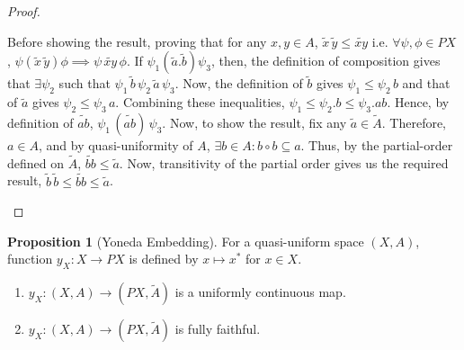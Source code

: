 \documentclass[18pt,a4paper]{article}
\theoremstyle{definition}
\newtheorem{proop}[theorem]{Proposition}
\begin{document}
\begin{proof}
\begin{enumerate}[label=(\roman*)]
			Before showing the result, proving that for any $x,y \in A$,
			$\tilde{x} \, \tilde{y} \leq \widetilde{xy}$
			i.e. $\forall \psi, \phi \in PX$ , $\psi(\tilde{x} \, \tilde{y})\phi \implies
			\psi \, \widetilde{xy} \, \phi $.
			If $\psi_1(\tilde{a} .\tilde{b} )\psi_3$, then, the definition of composition
			gives that $\exists \psi_2$ such that $\psi_1 \, \tilde{b} \, \psi_2 \,
			\tilde{a} \, \psi_3$. Now, the definition of $\tilde{b}$ gives $\psi_1 \leq \psi_2
			\,b$ and that of $\tilde{a}$ gives $\psi_2 \leq \psi_3 \, a$. Combining
			these inequalities, $\psi_1 \leq \psi_2.b \leq \psi_3.ab$.
			Hence, by definition of	$\widetilde{ab}$, $\psi_1 \,(\widetilde{ab})\,\psi_3$.
			Now, to show the result, fix any $\tilde{a}\in \tilde{A}$. Therefore,$a\in A$, and
			by quasi-uniformity of $A$, $\exists b \in A: b \circ b \subseteq
			a$. Thus, by the partial-order defined on $\tilde{A}$, $\widetilde{bb} \leq \tilde{a}$.
			Now, transitivity of the partial order gives us the required result,
			$ \tilde{b} \, \tilde{b} \leq \widetilde{bb} \leq \tilde{a}$. \qedhere
	\end{enumerate}
\end{proof}
\begin{proop}[Yoneda Embedding]
\item For a quasi-uniform space $(X,A)$, function $y_X:X \to PX$ is defined by $x\mapsto x^*$ for $x \in X$.
	\begin{enumerate}[label=(\alph*)]
		\item $y_X:(X,A) \rightarrow (PX,\tilde{A})$ is a uniformly continuous map.
		\item $y_X:(X,A) \rightarrow (PX,\tilde{A})$ is fully faithful.
	\end{enumerate}
\end{proop}
\end{document}
